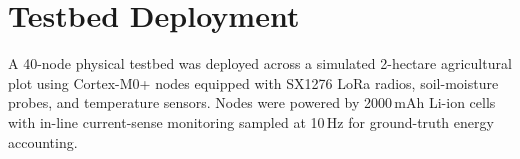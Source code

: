 \section{Testbed Deployment}
A 40-node physical testbed was deployed across a simulated 2-hectare agricultural plot using
Cortex-M0+ nodes equipped with SX1276 LoRa radios, soil-moisture probes, and temperature
sensors. Nodes were powered by 2000\,mAh Li-ion cells with in-line current-sense monitoring
sampled at 10\,Hz for ground-truth energy accounting.
